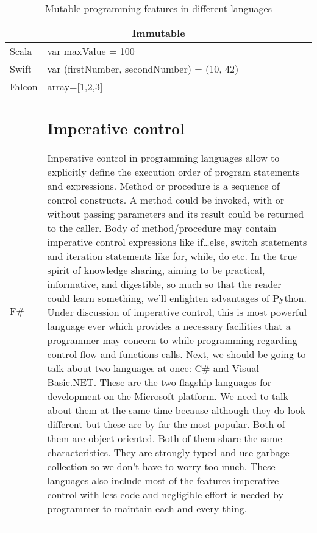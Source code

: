 \documentclass{sig-alternate}
\begin{document}
\begin{table}[]
\centering
\caption{Mutable programming features in different languages}
\label{my-label}
\begin{tabular}{|l|l|}
\hline
\multicolumn{2}{|c|}{Immutable}                     \\ \hline
Scala  & var maxValue = 100                         \\ \hline
Swift  & var (firstNumber, secondNumber) = (10, 42) \\ \hline
Falcon & array={[}1,2,3{]}                          \\ \hline
F\#    & \subsection{Imperative control}
Imperative control in programming languages allow to explicitly define the execution order of program statements and expressions. Method or procedure is a sequence of control constructs. A method could be invoked, with or without passing parameters and its result could be returned to the caller. Body of method/procedure may contain imperative control expressions like if…else, switch statements and iteration statements like for, while, do etc.
In the true spirit of knowledge sharing, aiming to be practical, informative, and digestible, so much so that the reader could learn something, we’ll enlighten advantages of Python. Under discussion of imperative control, this is most powerful language ever which provides a necessary facilities that a programmer may concern to while programming regarding control flow and functions calls. Next, we should be going to talk about two languages at once: C# and Visual Basic.NET. These are the two flagship languages for development on the Microsoft platform. We need to talk about them at the same time because although they do look different but these are by far the most popular. Both of them are object oriented. Both of them share the same characteristics. They are strongly typed and use garbage collection so we don't have to worry too much. These languages also include most of the features imperative control with less code and negligible effort is needed by programmer to maintain each and every thing. 



\end{tabular}
\end{table}
\end{document}
